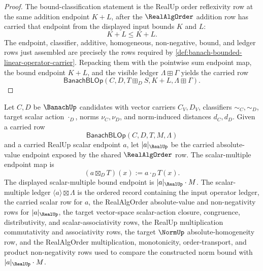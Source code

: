 \begin{proof}
The bound-classification statement is the RealUp order reflexivity row at the
same addition endpoint $K+L$, after the $\RealAlgOrder$ addition row has
carried that endpoint from the displayed input bounds $K$ and $L$:
$$
K+L\le K+L.
$$
The endpoint, classifier, additive, homogeneous, non-negative, bound, and
ledger rows just assembled are precisely the rows required by
\autoref{def:banach-bounded-linear-operator-carrier}. Repacking them with the
pointwise sum endpoint map, the bound endpoint $K+L$, and the visible ledger
$\Lambda\boxplus\Gamma$ yields the carried row
$$
\mathsf{BanachBLOp}(C,D,T\boxplus_D S,K+L,\Lambda\boxplus\Gamma).
$$
\end{proof}

\begin{definition}
\label{def:banach-bounded-linear-operator-scalar-multiple-carrier}
Let $C,D$ be $\BanachUp$ candidates with vector carriers $C_V,D_V$, classifiers $\sim_C,\sim_D$, target scalar action $\cdot_D$, norms $\nu_C,\nu_D$, and norm-induced distances $d_C,d_D$. Given a carried row
$$
\mathsf{BanachBLOp}(C,D,T,M,\Lambda)
$$
and a carried RealUp scalar endpoint $a$, let $|a|_{\RealUp}$ be the carried absolute-value endpoint exposed by the shared $\RealAlgOrder$ row. The scalar-multiple endpoint map is
$$
(a\boxtimes_D T)(x):=a\cdot_D T(x).
$$
The displayed scalar-multiple bound endpoint is $|a|_{\RealUp}\cdot M$. The scalar-multiple ledger $\langle a\rangle\boxtimes\Lambda$ is the ordered record containing the input operator ledger, the carried scalar row for $a$, the RealAlgOrder absolute-value and non-negativity rows for $|a|_{\RealUp}$, the target vector-space scalar-action closure, congruence, distributivity, and scalar-associativity rows, the RealUp multiplication commutativity and associativity rows, the target $\NormUp$ absolute-homogeneity row, and the RealAlgOrder multiplication, monotonicity, order-transport, and product non-negativity rows used to compare the constructed norm bound with $|a|_{\RealUp}\cdot M$.
\end{definition}

